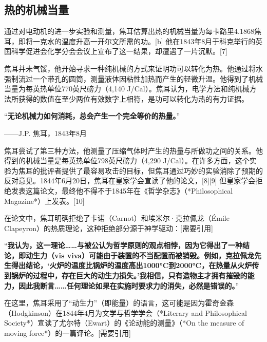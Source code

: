 \subsection{热的机械当量}  
通过对电动机的进一步实验和测量，焦耳估算出热的机械当量为每卡路里4.1868焦耳，即将一克水的温度升高一开尔文所需的功。[b] 他在1843年8月于科克举行的英国科学促进会化学分会会议上宣布了这一结果，却遭遇了一片沉默。[7]  

焦耳并未气馁，他开始寻求一种纯机械的方式来证明功可以转化为热。他通过将水强制流过一个带孔的圆筒，测量液体因粘性加热而产生的轻微升温。他得到了机械当量为每英热单位770英尺磅力（4,140 J/Cal）。焦耳认为，电学方法和纯机械方法所获得的数值在至少两位有效数字上相符，是功可以转化为热的有力证据。  

“\textbf{无论机械力如何消耗，总会产生一个完全等价的热量。}”

——J.P. 焦耳，1843年8月  

焦耳尝试了第三种方法，他测量了压缩气体时产生的热量与所做功之间的关系。他得到的机械当量是每英热单位798英尺磅力（4,290 J/Cal）。在许多方面，这个实验为焦耳的批评者提供了最容易攻击的目标，但焦耳通过巧妙的实验消除了预期的反对意见。1844年6月20日，焦耳在皇家学会宣读了他的论文，[8][9] 但皇家学会拒绝发表这篇论文，最终他不得不于1845年在《哲学杂志》（*Philosophical Magazine*）上发表。[10]  

在论文中，焦耳明确拒绝了卡诺（Carnot）和埃米尔·克拉佩龙（Émile Clapeyron）的热质理论，这种拒绝部分源于神学驱动：[需要引用]  

“\textbf{我认为，这一理论……与被公认为哲学原则的观点相悖，因为它得出了一种结论，即动生力（vis viva）可能由于装置的不当配置而被销毁。例如，克拉佩龙先生得出结论，‘火炉的温度比锅炉的温度高出1000°C到2000°C，在热量从火炉传到锅炉的过程中，存在巨大的动生力损失。’我相信，只有造物主才拥有摧毁的能力，因此我断言……任何理论如果在实施时要求力的消失，必然是错误的。}”

在这里，焦耳采用了“动生力”（即能量）的语言，这可能是因为霍奇金森（Hodgkinson）在1844年4月为文学与哲学学会（*Literary and Philosophical Society*）宣读了尤尔特（Ewart）的《论动能的测量》（*On the measure of moving force*）的一篇评论。[需要引用]  